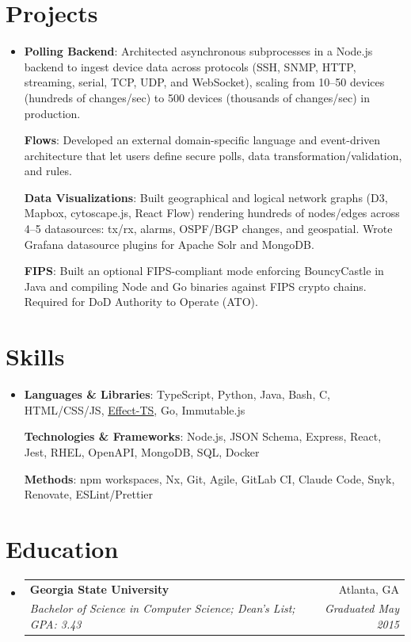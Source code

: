 \documentclass[letterpaper,11pt]{article}
\makeatletter
\newcommand{\mytexttilde}{\raisebox{0.5ex}{\texttildelow}}
\newcommand{\resumeSubHeadingListStart}{\begin{itemize}[leftmargin=0.08in, label={}]}
\newcommand{\resumeSubHeadingListEnd}{\end{itemize}}
\newcommand{\resumeSubheadingWithFootnote}[4]{
  \vspace{-5pt}\item
    \begin{tabular*}{0.97\textwidth}[t]{l@{\extracolsep{\fill}}r}
      \textbf{#1} & #2 \vspace{0pt} \\
      \textit{\small#3} & \textit{\small#4} \\
    \end{tabular*}\vspace{-7pt}
}
\newcommand{\boldSubjectWithDesc}[2]{
  \normalsize{\textbf{#1}{: #2 \vspace{-2pt}}}
}
\makeatother
\begin{document}
\section{Projects}
\resumeSubHeadingListStart
\item{
            \boldSubjectWithDesc{Polling Backend}{
              Architected asynchronous subprocesses in a Node.js backend to ingest device data across protocols (SSH, SNMP, HTTP, streaming, serial, TCP, UDP, and WebSocket), scaling from 10--50 devices (hundreds of changes/sec) to \mytexttilde500 devices (thousands of changes/sec) in production.
            }

            \boldSubjectWithDesc{Flows}{Developed an external domain-specific language and event-driven architecture that let users define secure polls, data transformation/validation, and rules.}

            \boldSubjectWithDesc{Data Visualizations}{
              Built geographical and logical network graphs (D3, Mapbox, cytoscape.js, React Flow) rendering hundreds of nodes/edges across 4--5 datasources: tx/rx, alarms, OSPF/BGP changes, and geospatial. Wrote Grafana datasource plugins for Apache Solr and MongoDB.
            }

            \boldSubjectWithDesc{FIPS}{Built an optional FIPS-compliant mode enforcing BouncyCastle in Java and compiling Node and Go binaries against FIPS crypto chains. Required for DoD Authority to Operate (ATO).}
      }
\resumeSubHeadingListEnd

\section{Skills}
\resumeSubHeadingListStart
\item{
            \boldSubjectWithDesc{Languages \& Libraries}{TypeScript, Python, Java, Bash, C, HTML/CSS/JS, \href{https://github.com/Effect-TS/effect}{Effect-TS}, Go, Immutable.js}

            \boldSubjectWithDesc{Technologies \& Frameworks}{Node.js, JSON Schema, Express, React, Jest, RHEL, OpenAPI, MongoDB, SQL, Docker}

            \boldSubjectWithDesc{Methods}{npm workspaces, Nx, Git, Agile, GitLab CI, Claude Code, Snyk, Renovate, ESLint/Prettier}
      }
\resumeSubHeadingListEnd

\section{Education}
\vspace{2pt}
\resumeSubHeadingListStart
\resumeSubheadingWithFootnote
{Georgia State University}{Atlanta, GA}
{Bachelor of Science in Computer Science; Dean's List; GPA: 3.43}{Graduated May 2015}
\resumeSubHeadingListEnd
\end{document}
